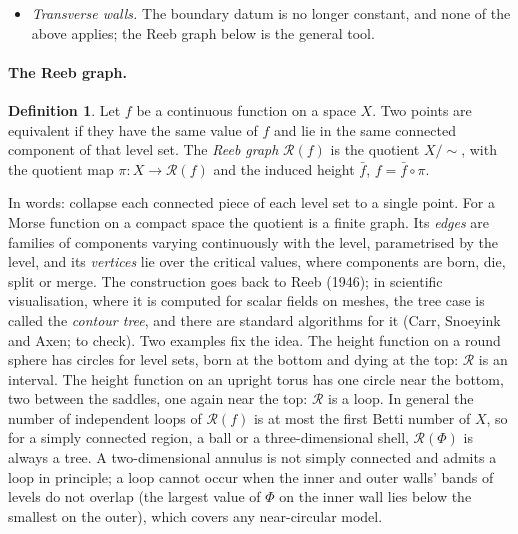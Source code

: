 \documentclass[11pt]{article}
\theoremstyle{definition}
\newtheorem{definition}{Definition}
\theoremstyle{remark}
\begin{document}
\begin{itemize}
  $\beta(0) = 0$. For the gravitational shell that would mean density
  increasing outward and vanishing at the outer wall, which is not the
  physical case. And Hamel, Nadirashvili and Sire (2016, Theorem 1.4)
  show that with $\beta$ a positive constant (uniform density) there are
  convex rings on which the level sets are not convex. So for the shell
  the assurance is near-sphericity, not a theorem; the counterexamples
  need rings far from concentric spheres (\S\ref{sec:shell}).
\item \emph{Transverse walls.} The boundary datum is no longer
  constant, and none of the above applies; the Reeb graph below is the
  general tool.
\end{itemize}

\paragraph{The Reeb graph.}

\begin{definition}
\label{def:reeb}
Let $f$ be a continuous function on a space $X$. Two points are
equivalent if they have the same value of $f$ and lie in the same
connected component of that level set. The \emph{Reeb graph}
$\mathcal R(f)$ is the quotient $X/\!\sim$, with the quotient map $\pi:
X \to \mathcal R(f)$ and the induced height $\bar f$, $f = \bar
f\circ\pi$.
\end{definition}

In words: collapse each connected piece of each level set to a single
point. For a Morse function on a compact space the quotient is a
finite graph. Its \emph{edges} are families of components varying
continuously with the level, parametrised by the level, and its
\emph{vertices} lie over the critical values, where components are
born, die, split or merge. The construction goes back to Reeb (1946);
in scientific visualisation, where it is computed for scalar fields on
meshes, the tree case is called the \emph{contour tree}, and there are
standard algorithms for it (Carr, Snoeyink and Axen; to check). Two
examples fix the idea. The height function on a round sphere has
circles for level sets, born at the bottom and dying at the top:
$\mathcal R$ is an interval. The height function on an upright torus
has one circle near the bottom, two between the saddles, one again
near the top: $\mathcal R$ is a loop. In general the number of
independent loops of $\mathcal R(f)$ is at most the first Betti number
of $X$, so for a simply connected region, a ball or a
three-dimensional shell, $\mathcal R(\Phi)$ is always a tree. A
two-dimensional annulus is not simply connected and admits a loop in
principle; a loop cannot occur when the inner and outer walls' bands
of levels do not overlap (the largest value of $\Phi$ on the inner
wall lies below the smallest on the outer), which covers any
near-circular model.
\end{document}
